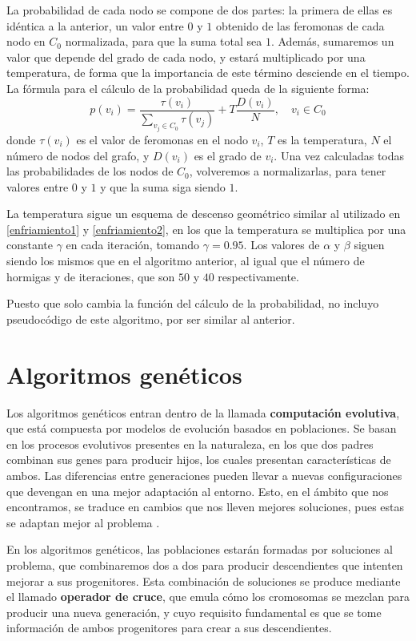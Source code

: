 La probabilidad de cada nodo se compone de dos partes: la primera de ellas es idéntica
a la anterior, un valor entre $0$ y $1$ obtenido de las feromonas de cada nodo en $C_0$
normalizada, para que la suma total sea $1$. Además, sumaremos un valor que depende
del grado de cada nodo, y estará multiplicado por una temperatura, de forma que la
importancia de este término desciende en el tiempo. La fórmula para el cálculo
de la probabilidad queda de la siguiente forma:
\[ p(v_i) = \frac{\tau(v_i)}{\sum\limits_{v_j \in C_0} \tau(v_j)} + T \frac{D(v_i)}{N}, \quad v_i \in C_0 \]
donde $\tau(v_i)$ es el valor de feromonas en el nodo $v_i$, $T$ es la temperatura,
$N$ el número de nodos del grafo, y $D(v_i)$ es el grado de $v_i$. Una vez calculadas
todas las probabilidades de los nodos de $C_0$, volveremos a normalizarlas, para tener
valores entre $0$ y $1$ y que la suma siga siendo $1$.

La temperatura sigue un esquema de descenso geométrico similar al utilizado en
\autoref{enfriamiento1} y \autoref{enfriamiento2}, en los que la temperatura se multiplica
por una constante $\gamma$ en cada iteración, tomando $\gamma = 0.95$. Los valores
de $\alpha$ y $\beta$ siguen siendo los mismos que en el algoritmo anterior, al
igual que el número de hormigas y de iteraciones, que son $50$ y $40$ respectivamente.

Puesto que solo cambia la función del cálculo de la probabilidad, no incluyo pseudocódigo
de este algoritmo, por ser similar al anterior.

\section{Algoritmos genéticos}\label{genetico}

Los algoritmos genéticos entran dentro de la llamada \textbf{computación evolutiva},
que está compuesta por modelos de evolución basados en poblaciones. Se basan en
los procesos evolutivos presentes en la naturaleza, en los que dos padres combinan
sus genes para producir hijos, los cuales presentan características de ambos.
Las diferencias entre generaciones pueden llevar a nuevas configuraciones que
devengan en una mejor adaptación al entorno. Esto, en el ámbito que nos encontramos,
se traduce en cambios que nos lleven mejores soluciones, pues estas se adaptan
mejor al problema \citep{herrera:2014}.

En los algoritmos genéticos, las poblaciones estarán formadas por soluciones al
problema, que combinaremos dos a dos para producir descendientes que intenten mejorar
a sus progenitores. Esta combinación de soluciones se produce mediante el llamado
\textbf{operador de cruce}, que emula cómo los cromosomas se mezclan para producir
una nueva generación, y cuyo requisito fundamental es que se tome información de
ambos progenitores para crear a sus descendientes.

